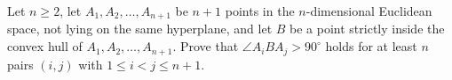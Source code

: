 Let \(n\ge2\), let \(A_1,A_2,\ldots,A_{n+1}\) be \(n+1\) points in the \(n\)-dimensional Euclidean space, not lying on the same hyperplane, and let \(B\) be a point strictly inside the convex hull of \(A_1,A_2,\ldots,A_{n+1}\). Prove that \(\angle A_iBA_j > 90^\circ\) holds for at least \(n\) pairs \((i,j)\) with \(\displaystyle{1\le i < j\le n+1}\).
